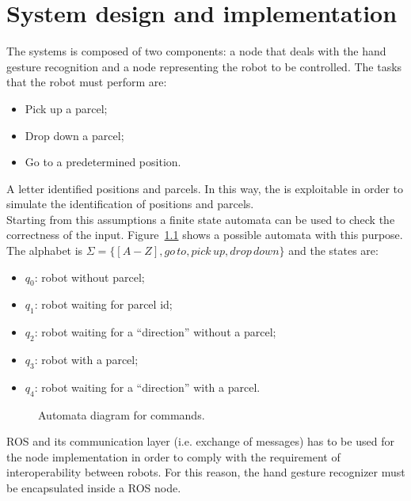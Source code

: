 \documentclass[../thesis.tex]{subfiles}
\begin{document}
\chapter{System design and implementation}\label{cap:system-design-and-implementation}
The systems is composed of two components: a node that deals with the hand gesture recognition and a node representing the robot to be controlled. The tasks that the robot must perform are:
\begin{itemize}
    \item Pick up a parcel;
    \item Drop down a parcel;
    \item Go to a predetermined position.
\end{itemize}
A letter identified positions and parcels. In this way, the  is exploitable in order to simulate the identification of positions and parcels.\\
Starting from this assumptions a finite state automata can be used to check the correctness of the input. Figure~\ref{fig:automata_for_commands} shows a possible automata with this purpose. The alphabet is $\Sigma = \{[A-Z], go\, to, pick\, up, drop\, down\}$ and the states are:
\begin{itemize}
    \item \textbf{$q_0$}: robot without parcel; 
    \item \textbf{$q_1$}: robot waiting for parcel id; 
    \item \textbf{$q_2$}: robot waiting for a ``direction'' without a parcel;
    \item \textbf{$q_3$}: robot with a parcel;
    \item \textbf{$q_4$}: robot waiting for a ``direction'' with a parcel.
\end{itemize}

\begin{figure}[H]
    \centering
    \caption{Automata diagram for commands.}\label{fig:automata_for_commands}
\end{figure}
\gls{ROS} and its communication layer (i.e. exchange of messages) has to be used for the node implementation in order to comply with the requirement of interoperability between robots. For this reason, the hand gesture recognizer must be encapsulated inside a \gls{ROS} node.
\end{document}
